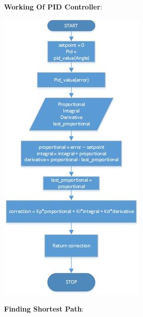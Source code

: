 \documentclass[report]{res}
\begin{document}
	\pagebreak
	\textbf{\Large Working Of PID Controller}:\\
	
	\begin{center}
		\includegraphics[scale = 1.2]{graphics/drawing2.jpg}\\
	\end{center}
	
	\pagebreak
	
	
	\textbf{\Large Finding Shortest Path}:\\ \\
	
\end{document}
